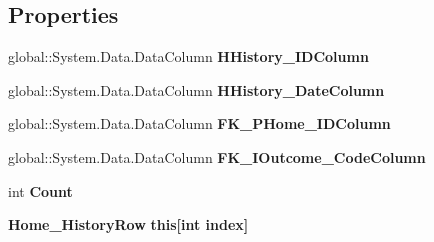 \subsection*{Properties}
\begin{DoxyCompactItemize}
\item 
\mbox{\label{class_a_f_h___scheduler_1_1_home_inspection_data_set_1_1_home___history_data_table_aa0c454dffefba2ea5a772a1c7f75b890}} 
global\+::\+System.\+Data.\+Data\+Column {\bfseries H\+History\+\_\+\+I\+D\+Column}\hspace{0.3cm}{\ttfamily  [get]}
\item 
\mbox{\label{class_a_f_h___scheduler_1_1_home_inspection_data_set_1_1_home___history_data_table_af92d9cc2350761d3b019b915498fd03e}} 
global\+::\+System.\+Data.\+Data\+Column {\bfseries H\+History\+\_\+\+Date\+Column}\hspace{0.3cm}{\ttfamily  [get]}
\item 
\mbox{\label{class_a_f_h___scheduler_1_1_home_inspection_data_set_1_1_home___history_data_table_ae9a99d1a885a6bccae622dadf6ac690c}} 
global\+::\+System.\+Data.\+Data\+Column {\bfseries F\+K\+\_\+\+P\+Home\+\_\+\+I\+D\+Column}\hspace{0.3cm}{\ttfamily  [get]}
\item 
\mbox{\label{class_a_f_h___scheduler_1_1_home_inspection_data_set_1_1_home___history_data_table_a33cc1e0f86bb2a8d8a6fc35021dbdc24}} 
global\+::\+System.\+Data.\+Data\+Column {\bfseries F\+K\+\_\+\+I\+Outcome\+\_\+\+Code\+Column}\hspace{0.3cm}{\ttfamily  [get]}
\item 
\mbox{\label{class_a_f_h___scheduler_1_1_home_inspection_data_set_1_1_home___history_data_table_a14859cf9be7c0346f2e77355e44f37ec}} 
int {\bfseries Count}\hspace{0.3cm}{\ttfamily  [get]}
\item 
\mbox{\label{class_a_f_h___scheduler_1_1_home_inspection_data_set_1_1_home___history_data_table_a205cbfbfe1c1df537d0c2e76c6afafaf}} 
\textbf{ Home\+\_\+\+History\+Row} {\bfseries this[int index]}\hspace{0.3cm}{\ttfamily  [get]}
\end{DoxyCompactItemize}
